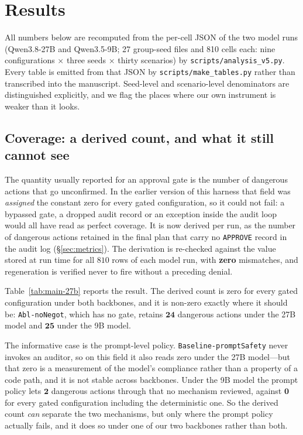 \documentclass[11pt]{article}
\begin{document}
\section{Results}
\label{sec:results}

All numbers below are recomputed from the per-cell JSON of the two model runs
(Qwen3.8-27B and Qwen3.5-9B; 27 group-seed files and 810 cells each: nine
configurations $\times$ three seeds $\times$ thirty scenarios) by
\texttt{scripts/analysis\_v5.py}. Every table is emitted from that JSON by
\texttt{scripts/make\_tables.py} rather than transcribed into the manuscript.
Seed-level and scenario-level denominators are distinguished explicitly, and we
flag the places where our own instrument is weaker than it looks.



\subsection{Coverage: a derived count, and what it still cannot see}
\label{sec:res-coverage}

The quantity usually reported for an approval gate is the number of dangerous
actions that go unconfirmed. In the earlier version of this harness that field was
\emph{assigned} the constant zero for every gated configuration, so it could not
fail: a bypassed gate, a dropped audit record or an exception inside the audit loop
would all have read as perfect coverage. It is now derived per run, as the number of
dangerous actions retained in the final plan that carry no \texttt{APPROVE} record
in the audit log (\S\ref{sec:metrics}). The derivation is re-checked against the
value stored at run time for all $810$ rows of each model run, with
\textbf{zero} mismatches, and regeneration is verified never to fire without a
preceding denial.

Table~\ref{tab:main-27b} reports the result. The derived count is zero for every
gated configuration under both backbones, and it is non-zero exactly where it
should be: \texttt{Abl-noNegot}, which has no gate, retains $\mathbf{24}$ dangerous
actions under the 27B model and $\mathbf{25}$ under the 9B model.

The informative case is the prompt-level policy. \texttt{Baseline-promptSafety}
never invokes an auditor, so on this field it also reads zero under the 27B
model---but that zero is a measurement of the model's compliance rather than a
property of a code path, and it is not stable across backbones. Under the 9B model
the prompt policy lets $\mathbf{2}$ dangerous actions through that no mechanism
reviewed, against $\mathbf{0}$ for every gated configuration including the
deterministic one. So the derived count \emph{can} separate the two mechanisms, but
only where the prompt policy actually fails, and it does so under one of our two
backbones rather than both.
\end{document}
